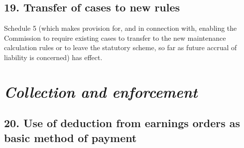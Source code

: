 \documentclass[12pt,a4paper]{article}
\begin{document}
\subsection{19. Transfer of cases to new rules}

Schedule 5 (which makes provision for, and in connection with, enabling the Commission to require existing cases to transfer to the new maintenance calculation rules or to leave the statutory scheme, so far as future accrual of liability is concerned) has effect. 

\section{\itshape Collection and enforcement}

\subsection{20. Use of deduction from earnings orders as basic method of payment}
\end{document}
